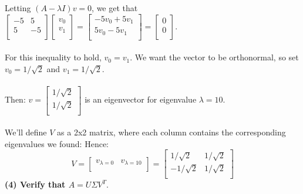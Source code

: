 \documentclass[11pt]{article}
\begin{document}
Letting $(A - \lambda I)v = 0$, we get that $ \begin{bmatrix}
-5 & 5 \\
5 & -5 \\
\end{bmatrix} \begin{bmatrix}
v_0 \\
v_1 \\
\end{bmatrix} = \begin{bmatrix}
-5v_0 + 5v_1 \\
5v_0 -5v_1 \\
\end{bmatrix} = \begin{bmatrix}
0 \\
0 \\
\end{bmatrix} $. \\\\
For this inequality to hold, $v_0 = v_1$. We want the vector to be orthonormal, so set $v_0 = 1 / \sqrt2$ and $v_1 = 1 / \sqrt2.$ \\\\
Then: $v = \begin{bmatrix}
1 / \sqrt2 \\
1 / \sqrt2 \\
\end{bmatrix}$ is an eigenvector for eigenvalue $\lambda = 10$. \\\\
We'll define $V$ as a 2x2 matrix, where each column contains the corresponding eigenvalues we found:
Hence:
$$ \boxed{ V = \begin{bmatrix} 
v_{\lambda = 0} & v_{\lambda = 10} \\
\end{bmatrix} = \begin{bmatrix}
1 / \sqrt2 & 1 / \sqrt2 \\
-1 / \sqrt2 & 1 / \sqrt2 \\
\end{bmatrix}}$$
\textbf{(4) Verify that $A = U \Sigma V^T.$}
\end{document}
